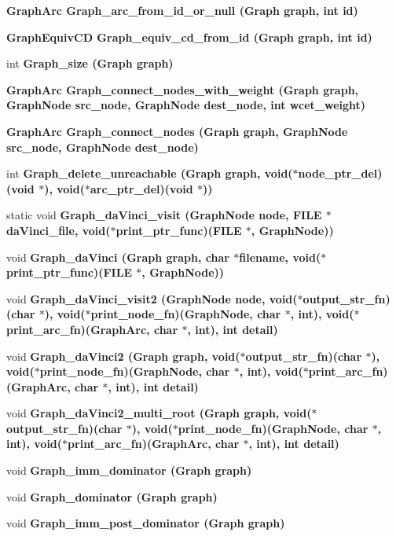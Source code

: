 \begin{CompactItemize}
\item 
\bf{Graph\-Arc} \bf{Graph\_\-arc\_\-from\_\-id\_\-or\_\-null} (\bf{Graph} \bf{graph}, int id)
\item 
\bf{Graph\-Equiv\-CD} \bf{Graph\_\-equiv\_\-cd\_\-from\_\-id} (\bf{Graph} \bf{graph}, int id)
\item 
int \bf{Graph\_\-size} (\bf{Graph} \bf{graph})
\item 
\bf{Graph\-Arc} \bf{Graph\_\-connect\_\-nodes\_\-with\_\-weight} (\bf{Graph} \bf{graph}, \bf{Graph\-Node} src\_\-node, \bf{Graph\-Node} dest\_\-node, int wcet\_\-weight)
\item 
\bf{Graph\-Arc} \bf{Graph\_\-connect\_\-nodes} (\bf{Graph} \bf{graph}, \bf{Graph\-Node} src\_\-node, \bf{Graph\-Node} dest\_\-node)
\item 
int \bf{Graph\_\-delete\_\-unreachable} (\bf{Graph} \bf{graph}, void($\ast$node\_\-ptr\_\-del)(void $\ast$), void($\ast$arc\_\-ptr\_\-del)(void $\ast$))
\item 
static void \bf{Graph\_\-da\-Vinci\_\-visit} (\bf{Graph\-Node} \bf{node}, FILE $\ast$da\-Vinci\_\-file, void($\ast$print\_\-ptr\_\-func)(FILE $\ast$, \bf{Graph\-Node}))
\item 
void \bf{Graph\_\-da\-Vinci} (\bf{Graph} \bf{graph}, char $\ast$filename, void($\ast$print\_\-ptr\_\-func)(FILE $\ast$, \bf{Graph\-Node}))
\item 
void \bf{Graph\_\-da\-Vinci\_\-visit2} (\bf{Graph\-Node} \bf{node}, void($\ast$output\_\-str\_\-fn)(char $\ast$), void($\ast$print\_\-node\_\-fn)(\bf{Graph\-Node}, char $\ast$, int), void($\ast$print\_\-arc\_\-fn)(\bf{Graph\-Arc}, char $\ast$, int), int detail)
\item 
void \bf{Graph\_\-da\-Vinci2} (\bf{Graph} \bf{graph}, void($\ast$output\_\-str\_\-fn)(char $\ast$), void($\ast$print\_\-node\_\-fn)(\bf{Graph\-Node}, char $\ast$, int), void($\ast$print\_\-arc\_\-fn)(\bf{Graph\-Arc}, char $\ast$, int), int detail)
\item 
void \bf{Graph\_\-da\-Vinci2\_\-multi\_\-root} (\bf{Graph} \bf{graph}, void($\ast$output\_\-str\_\-fn)(char $\ast$), void($\ast$print\_\-node\_\-fn)(\bf{Graph\-Node}, char $\ast$, int), void($\ast$print\_\-arc\_\-fn)(\bf{Graph\-Arc}, char $\ast$, int), int detail)
\item 
void \bf{Graph\_\-imm\_\-dominator} (\bf{Graph} \bf{graph})
\item 
void \bf{Graph\_\-dominator} (\bf{Graph} \bf{graph})
\item 
void \bf{Graph\_\-imm\_\-post\_\-dominator} (\bf{Graph} \bf{graph})

\end{CompactItemize}
